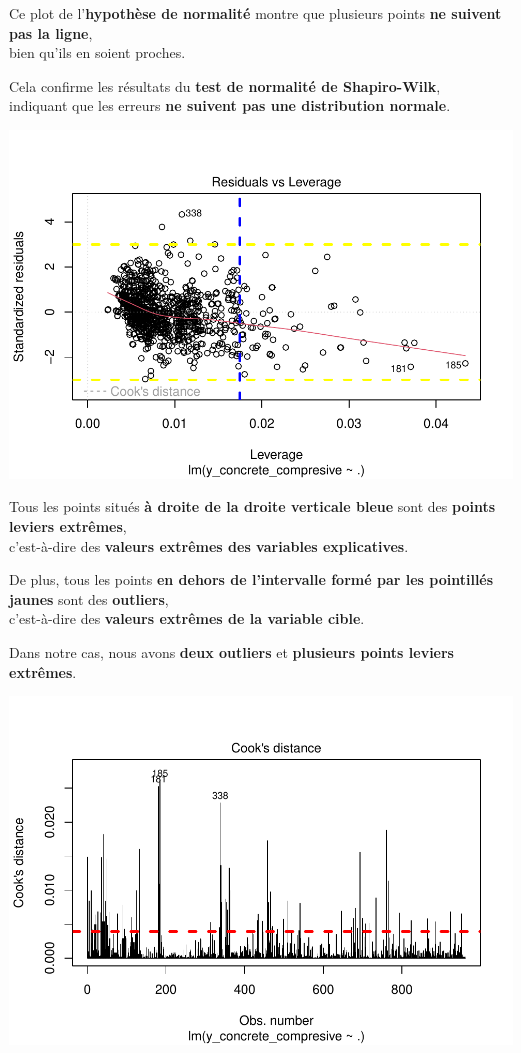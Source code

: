 \documentclass[
  12pt,
]{article}
\begin{document}
Ce plot de l'\textbf{hypothèse de normalité} montre que plusieurs points
\textbf{ne suivent pas la ligne},\\
bien qu'ils en soient proches.

Cela confirme les résultats du \textbf{test de normalité de
Shapiro-Wilk},\\
indiquant que les erreurs \textbf{ne suivent pas une distribution
normale}.

\includegraphics{rmd_final_files/figure-latex/unnamed-chunk-21-1.pdf}

Tous les points situés \textbf{à droite de la droite verticale bleue}
sont des \textbf{points leviers extrêmes},\\
c'est-à-dire des \textbf{valeurs extrêmes des variables explicatives}.

De plus, tous les points \textbf{en dehors de l'intervalle formé par les
pointillés jaunes} sont des \textbf{outliers},\\
c'est-à-dire des \textbf{valeurs extrêmes de la variable cible}.

Dans notre cas, nous avons \textbf{deux outliers} et \textbf{plusieurs
points leviers extrêmes}.

\includegraphics{rmd_final_files/figure-latex/unnamed-chunk-22-1.pdf}
\end{document}
